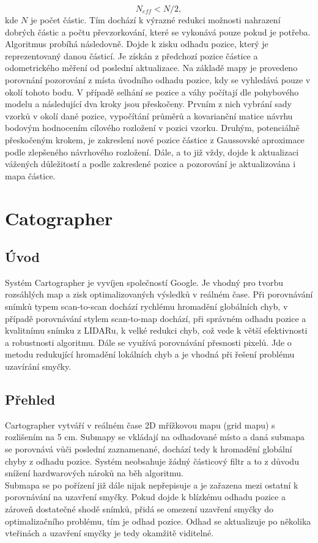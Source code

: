 \documentclass[11pt]{article}
\begin{document}
\begin{equation}
	N_{eff} < N/2,
\end{equation}
kde $N$ je počet částic. Tím dochází k výrazné redukci možnosti nahrazení dobrých částic a počtu převzorkování, které se vykonává pouze pokud je potřeba.\\
\indent Algoritmus probíhá následovně. Dojde k zisku odhadu pozice, který je reprezentovaný danou částicí. Je získán z předchozí pozice částice a odometrického měření od poslední aktualizace. Na základě mapy je provedeno porovnání pozorování z místa úvodního odhadu pozice, kdy se vyhledává pouze v okolí tohoto bodu. V případě selhání se pozice a váhy počítají dle pohybového modelu a následující dva kroky jsou přeskočeny. Prvním z nich vybrání sady vzorků v okolí dané pozice, vypočítání průměrů a kovarianční matice návrhu bodovým hodnocením cílového rozložení v pozici vzorku. Druhým, potenciálně přeskočeným krokem, je zakreslení nové pozice částice z Gaussovské aproximace podle zlepšeného návrhového rozložení. Dále, a to již vždy, dojde k aktualizaci vážených důležitostí a podle zakreslené pozice a pozorování je aktualizována i mapa částice. 
 
\newpage

\section{Catographer}

\subsection{Úvod}
Systém Cartographer je vyvíjen společností Google. Je vhodný pro tvorbu rozsáhlých map a zisk optimalizovaných výsledků v reálném čase. Při porovnávání snímků typem scan-to-scan dochází rychlému hromadění globálních chyb, v případě porovnávání stylem scan-to-map dochází, při správném odhadu pozice a kvalitnímu snímku z LIDARu, k velké redukci chyb, což vede k větší efektivnosti a robustnosti algoritmu. Dále se využívá porovnávání přesnosti pixelů. Jde o metodu redukující hromadění lokálních chyb a je vhodná při řešení problému uzavírání smyčky. \\

\subsection{Přehled}
Cartographer vytváří v reálném čase 2D mřížkovou mapu (grid mapu) s rozlišením na 5 cm. Submapy se vkládají na odhadované místo a daná submapa se porovnává vůči poslední zaznamenané, dochází tedy k hromadění globální chyby z odhadu pozice. Systém neobsahuje žádný částicový filtr a to z důvodu snížení hardwarových nároků na běh algoritmu.\\
\indent Submapa se po pořízení již dále nijak nepřepisuje a je zařazena mezi ostatní k porovnávání na uzavření smyčky. Pokud dojde k blízkému odhadu pozice a zároveň dostatečné shodě snímků, přidá se omezení uzavření smyčky do optimalizačního problému, tím je odhad pozice. Odhad se aktualizuje po několika vteřinách a uzavření smyčky je tedy okamžitě viditelné. 
\end{document}
